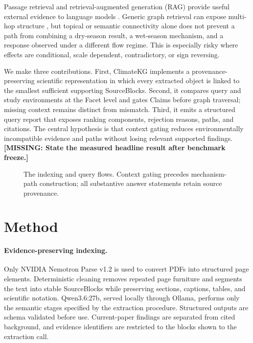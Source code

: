 \documentclass{article}
\newcommand{\missing}[1]{\textcolor{missingred}{\textbf{[MISSING: #1]}}}
\newcommand{\system}{ClimateKG}
\begin{document}
Passage retrieval and retrieval-augmented generation (RAG) provide useful
external evidence to language models \citep{lewis2020}. Generic graph retrieval
can expose multi-hop structure \citep{edge2024}, but topical or semantic
connectivity alone does not prevent a path from combining a dry-season result,
a wet-season mechanism, and a response observed under a different flow regime.
This is especially risky where effects are conditional, scale dependent,
contradictory, or sign reversing.

We make three contributions. First, \system{} implements a provenance-preserving
scientific representation in which every extracted object is linked to the
smallest sufficient supporting SourceBlocks. Second, it compares query and
study environments at the Facet level and gates Claims before graph traversal;
missing context remains distinct from mismatch. Third, it emits a structured
query report that exposes ranking components, rejection reasons, paths, and
citations. The central hypothesis is that context gating reduces environmentally
incompatible evidence and paths without losing relevant supported findings.
\missing{State the measured headline result after benchmark freeze.}

\begin{figure}[t]
  \centering
  \caption{The indexing and query flows. Context gating precedes mechanism-path
  construction; all substantive answer statements retain source provenance.}
  \label{fig:pipeline}
\end{figure}

\section{Method}

\paragraph{Evidence-preserving indexing.}
Only NVIDIA Nemotron Parse v1.2 is used to convert PDFs into structured page
elements. Deterministic cleaning removes repeated page furniture and segments
the text into stable SourceBlocks while preserving sections, captions, tables,
and scientific notation. Qwen3.6:27b, served locally through Ollama, performs
only the semantic stages specified by the extraction procedure. Structured
outputs are schema validated before use. Current-paper findings are separated
from cited background, and evidence identifiers are restricted to the blocks
shown to the extraction call.
\end{document}
